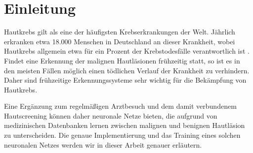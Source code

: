 \section{Einleitung}

Hautkrebs gilt als eine der häufigsten Krebserkrankungen der Welt. Jährlich erkranken etwa 18.000 Menschen in Deutschland an dieser Krankheit, wobei Hautkrebs allgemein etwa für ein Prozent der Krebstodesfälle verantwortlich ist \citep{hautkrebs}. Findet eine Erkennung der malignen Hautläsionen frühzeitig statt, so ist es in den meisten Fällen möglich einen tödlichen Verlauf der Krankheit zu verhindern. Daher sind frühzeitige Erkennungssysteme sehr wichtig für die Bekämpfung von Hautkrebs.

Eine Ergänzung zum regelmäßigen Arztbesuch und dem damit verbundenem Hautscreening können daher neuronale Netze bieten, die aufgrund von medizinischen Datenbanken lernen zwischen malignen und benignen Hautläsion zu unterscheiden. Die genaue Implementierung und das Training eines solchen neuronalen Netzes werden wir in dieser Arbeit genauer erläutern. 